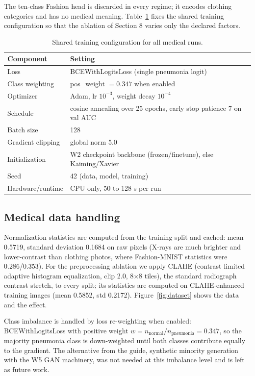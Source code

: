 \documentclass[11pt,a4paper]{article}
\begin{document}
The ten-class Fashion head is discarded in every regime; it encodes clothing categories and has no medical meaning. Table~\ref{tab:traincfg} fixes the shared training configuration so that the ablation of Section 8 varies only the declared factors.

\begin{table}[h]
\centering
\caption{Shared training configuration for all medical runs.}
\label{tab:traincfg}
\begin{tabular}{ll}
\toprule
Component & Setting \\
\midrule
Loss & BCEWithLogitsLoss (single pneumonia logit) \\
Class weighting & pos\_weight $= 0.347$ when enabled \\
Optimizer & Adam, lr $10^{-3}$, weight decay $10^{-4}$ \\
Schedule & cosine annealing over 25 epochs, early stop patience 7 on val AUC \\
Batch size & 128 \\
Gradient clipping & global norm 5.0 \\
Initialization & W2 checkpoint backbone (frozen/finetune), else Kaiming/Xavier \\
Seed & 42 (data, model, training) \\
Hardware/runtime & CPU only, 50 to 128 s per run \\
\bottomrule
\end{tabular}
\end{table}

\subsection{Medical data handling}

Normalization statistics are computed from the training split and cached: mean 0.5719, standard deviation 0.1684 on raw pixels (X-rays are much brighter and lower-contrast than clothing photos, where Fashion-MNIST statistics were 0.286/0.353). For the preprocessing ablation we apply CLAHE (contrast limited adaptive histogram equalization, clip 2.0, 8$\times$8 tiles), the standard radiograph contrast stretch, to every split; its statistics are computed on CLAHE-enhanced training images (mean 0.5852, std 0.2172). Figure~\ref{fig:dataset} shows the data and the effect.

Class imbalance is handled by loss re-weighting when enabled: BCEWithLogitsLoss with positive weight $w = n_{\text{normal}}/n_{\text{pneumonia}} = 0.347$, so the majority pneumonia class is down-weighted until both classes contribute equally to the gradient. The alternative from the guide, synthetic minority generation with the W5 GAN machinery, was not needed at this imbalance level and is left as future work.
\end{document}
